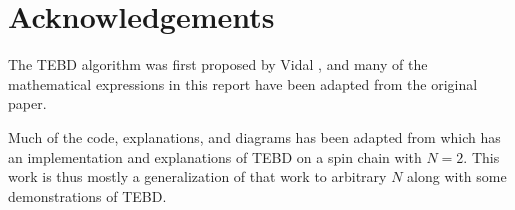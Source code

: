 \documentclass[a4paper, headsepline, footheight=13.6pt]{scrartcl}
\begin{document}
\section{Acknowledgements}
The TEBD algorithm was first proposed by Vidal \cite{Vidal:2004aa}, and many of the mathematical expressions in this report have been adapted from the original paper.

Much of the code, explanations, and diagrams has been adapted from \cite{tensorsnet} which has an implementation and explanations of TEBD on a spin chain with $N=2$. This work is thus mostly a generalization of that work to arbitrary $N$ along with some demonstrations of TEBD.

\clearpage
\newpage
\begin{flushleft}
\printbibliography
\end{flushleft}
\end{document}
